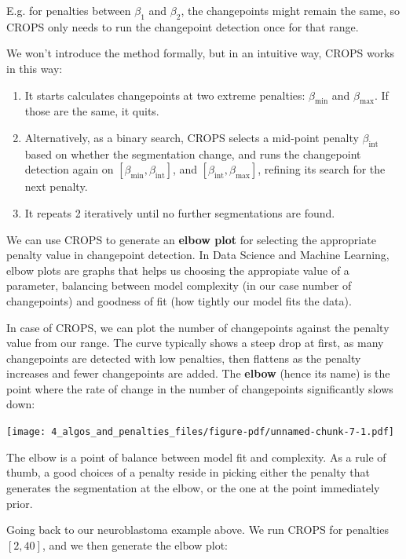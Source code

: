 \documentclass[
  letterpaper,
  DIV=11,
  numbers=noendperiod]{scrreprt}
\begin{document}
E.g. for penalties between \(\beta_1\) and \(\beta_2\), the changepoints
might remain the same, so CROPS only needs to run the changepoint
detection once for that range.

We won't introduce the method formally, but in an intuitive way, CROPS
works in this way:

\begin{enumerate}
\def\labelenumi{\arabic{enumi}.}
\item
  It starts calculates changepoints at two extreme penalties:
  \(\beta_{\text{min}}\) and \(\beta_{\text{max}}\). If those are the
  same, it quits.
\item
  Alternatively, as a binary search, CROPS selects a mid-point penalty
  \(\beta_\text{int}\) based on whether the segmentation change, and
  runs the changepoint detection again on
  \([\beta_{\text{min}}, \beta_{\text{int}}]\), and
  \([\beta_{\text{int}}, \beta_{\text{max}}]\), refining its search for
  the next penalty.
\item
  It repeats 2 iteratively until no further segmentations are found.
\end{enumerate}

We can use CROPS to generate an \textbf{elbow plot} for selecting the
appropriate penalty value in changepoint detection. In Data Science and
Machine Learning, elbow plots are graphs that helps us choosing the
appropiate value of a parameter, balancing between model complexity (in
our case number of changepoints) and goodness of fit (how tightly our
model fits the data).

In case of CROPS, we can plot the number of changepoints against the
penalty value from our range. The curve typically shows a steep drop at
first, as many changepoints are detected with low penalties, then
flattens as the penalty increases and fewer changepoints are added. The
\textbf{elbow} (hence its name) is the point where the rate of change in
the number of changepoints significantly slows down:

\texttt{[image: 4\_algos\_and\_penalties\_files/figure-pdf/unnamed-chunk-7-1.pdf]}

The elbow is a point of balance between model fit and complexity. As a
rule of thumb, a good choices of a penalty reside in picking either the
penalty that generates the segmentation at the elbow, or the one at the
point immediately prior.

Going back to our neuroblastoma example above. We run CROPS for
penalties \([2, 40]\), and we then generate the elbow plot:
\end{document}
